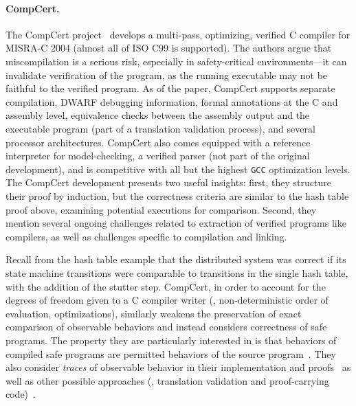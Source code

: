 \paragraph{CompCert.} The CompCert
project~\cite{Leroy-Compcert-CACM,Leroy-BKSPF-2016,Kastner-LBSSF-2017} develops
a multi-pass, optimizing, verified C compiler for MISRA-C 2004 (almost all of
ISO C99 is supported). The authors argue that miscompilation is a serious risk,
especially in safety-critical environments---it can invalidate verification
of the program, as the running executable may not be faithful to the verified
program. As of the \citeyear{Kastner-LBSSF-2017} paper, CompCert supports
separate compilation, DWARF debugging information, formal annotations at the C
and assembly level, equivalence checks between the assembly output and the
executable program (part of a translation validation process), and several
processor architectures. CompCert also comes equipped with a reference
interpreter for model-checking, a verified parser (not part of the original
\citeyear{Leroy-Compcert-CACM} development), and is competitive with all but the
highest \texttt{GCC} optimization levels. The CompCert development presents two
useful insights: first, they structure their proof by induction, but the
correctness criteria are similar to the hash table proof above, examining
potential executions for comparison. Second, they mention several ongoing
challenges related to extraction of verified programs like compilers, as well as
challenges specific to compilation and linking.

Recall from the hash table example that the distributed system was correct if
its state machine transitions were comparable to transitions in the single hash
table, with the addition of the stutter step. CompCert, in order to account for
the degrees of freedom given to a C compiler writer (\eg, non-deterministic
order of evaluation, optimizations), similarly weakens the preservation of exact
comparison of observable behaviors and instead considers correctness of safe
programs. The property they are particularly interested in is that behaviors of
compiled safe programs are permitted behaviors of the source
program~\cite[Section~2.1]{Leroy-Compcert-CACM}. They also consider
\emph{traces} of observable behavior in their implementation and
proofs~\cite{Kastner-LBSSF-2017} as well as other possible approaches (\eg,
translation validation and proof-carrying
code)~\cite[Section~2.2]{Leroy-Compcert-CACM}.

